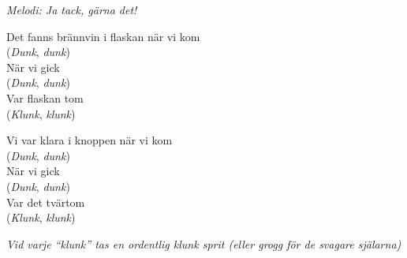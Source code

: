 {\footnotesize\textit{Melodi: Ja tack, gärna det!}}\par
\vspace{10pt}
Det fanns brännvin i flaskan när vi kom\\
(\textit{Dunk}, \textit{dunk})\\
När vi gick\\
(\textit{Dunk}, \textit{dunk})\\
Var flaskan tom\\
(\textit{Klunk}, \textit{klunk})\par
\vspace{10pt}
Vi var klara i knoppen när vi kom\\
(\textit{Dunk}, \textit{dunk})\\
När vi gick\\
(\textit{Dunk}, \textit{dunk})\\
Var det tvärtom\\
(\textit{Klunk}, \textit{klunk})\par
\vspace{10pt}
{\footnotesize\textit{Vid varje ``klunk'' tas en ordentlig klunk sprit (eller grogg för de svagare själarna)}}
